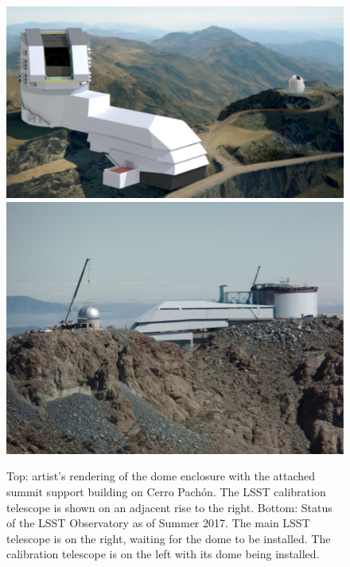 \begin{figure}
\includegraphics[width=1.0\hsize,clip]{observatoryFull.pdf}
\includegraphics[width=1.0\hsize,clip]{ObservatoryFull_2017.pdf}
\caption{Top: artist's rendering of the dome enclosure
with the attached summit support building on Cerro Pach\'{o}n. The LSST calibration
telescope is shown on an adjacent rise to the right.
Bottom: Status of the LSST Observatory as of Summer 2017. The main LSST telescope is on the right, waiting for the dome to be installed. The calibration telescope is on the left with its dome being installed.}
\label{Fig:observatory}
\end{figure}

